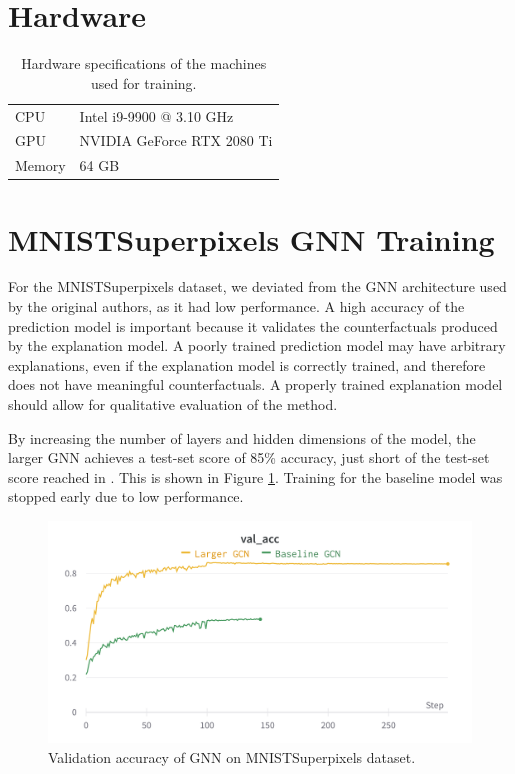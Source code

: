 \section{Hardware}
\label{appendix:hardware}
\begin{table}[h]
\centering
\caption{Hardware specifications of the machines used for training.}
\label{tab:appendix:hwspec}
\begin{tabular}{ll}
\toprule 
CPU    & Intel i9-9900 @ 3.10 GHz      \\
GPU    & NVIDIA GeForce RTX 2080 Ti   \\
Memory & 64 GB                        \\
\bottomrule
\end{tabular}
\end{table}

\section{MNISTSuperpixels GNN Training}
\label{appendix:GNN_training}
For the MNISTSuperpixels dataset, we deviated from the GNN architecture used by the original authors, as it had low performance. A high accuracy of the prediction model is important because it validates the counterfactuals produced by the explanation model. A poorly trained prediction model may have arbitrary explanations, even if the explanation model is correctly trained, and therefore does not have meaningful counterfactuals. A properly trained explanation model should allow for qualitative evaluation of the method.

By increasing the number of layers and hidden dimensions of the model, the larger GNN achieves a test-set score of 85\% accuracy, just short of the test-set score reached in \cite{dwivedi2020benchmarking}. This is shown in  Figure \ref{fig:MNIST_training_GNN}. Training for the baseline model was stopped early due to low performance.


\begin{figure}[!htbp]
    \centerline{\includegraphics[width=.9\textwidth,trim={0 0 0 5cm},clip]{Images/MNIST_GCN.png}}
    \caption{Validation accuracy of GNN on MNISTSuperpixels dataset.}
    \label{fig:MNIST_training_GNN}
\end{figure}

